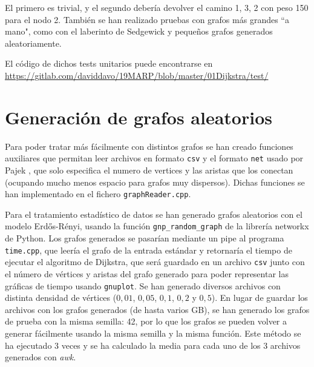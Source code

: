 \documentclass{article}
\begin{document}
El primero es trivial, y el segundo debería devolver el camino 1, 3, 2 con peso 150 para el nodo 2. También se han realizado pruebas con grafos más grandes ``a mano", como con el laberinto de Sedgewick \cite{SedgewickLabyrinth} y pequeños grafos generados aleatoriamente.

El código de dichos tests unitarios puede encontrarse en \url{https://gitlab.com/daviddavo/19MARP/blob/master/01Dijkstra/test/}

\section{Generación de grafos aleatorios}
Para poder tratar más fácilmente con distintos grafos se han creado funciones auxiliares que permitan leer archivos en formato \texttt{csv} y el formato \texttt{net}  usado por Pajek \cite{Pajek}, que solo especifica el numero de vertices y las aristas que los conectan (ocupando mucho menos espacio para grafos muy dispersos). Dichas funciones se han implementado en el fichero \texttt{graphReader.cpp}.

Para el tratamiento estadístico de datos se han generado grafos aleatorios con el modelo Erdős-Rényi, usando la función \texttt{gnp\_random\_graph} de la librería networkx de Python. Los grafos generados se pasarían mediante un pipe al programa \texttt{time.cpp}, que leería el grafo de la entrada estándar y retornaría el tiempo de ejecutar el algoritmo de Dijkstra, que será guardado en un archivo \texttt{csv} junto con el número de vértices y aristas del grafo generado para poder representar las gráficas de tiempo usando \texttt{gnuplot}. Se han generado diversos archivos con distinta densidad de vértices ($0,01$, $0,05$, $0,1$, $0,2$ y $0,5$). En lugar de guardar los archivos con los grafos generados (de hasta varios GB), se han generado los grafos de prueba con la misma semilla: 42, por lo que los grafos se pueden volver a generar fácilmente usando la misma semilla y la misma función. Este método se ha ejecutado 3 veces y se ha calculado la media para cada uno de los 3 archivos generados con \textit{awk}.

\nocite{*} %


\end{document}
